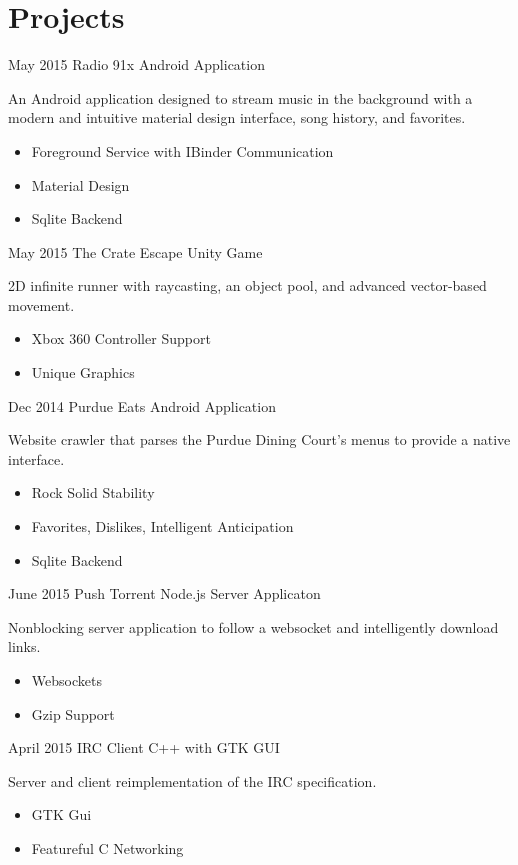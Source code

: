 \documentclass[]{friggeri-cv} %
\begin{document}
\section{Projects}

\begin{entrylist}


\entry
{May 2015}
{Radio 91x}
{Android Application}
{An Android application designed to stream music in the background with a modern and intuitive material design interface, song history, and favorites.
\begin{itemize}
\item Foreground Service with IBinder Communication
\item Material Design
\item Sqlite Backend
\end{itemize}}


\entry
{May 2015}
{The Crate Escape}
{Unity Game}
{2D infinite runner with raycasting, an object pool, and advanced vector-based movement.
\begin{itemize}
\item Xbox 360 Controller Support
\item Unique Graphics
\end{itemize}}


\entry
{Dec 2014}
{Purdue Eats}
{Android Application}
{Website crawler that parses the Purdue Dining Court's menus to provide a native interface.
\begin{itemize}
\item Rock Solid Stability
\item Favorites, Dislikes, Intelligent Anticipation
\item Sqlite Backend
\end{itemize}}


\entry
{June 2015}
{Push Torrent}
{Node.js Server Applicaton}
{Nonblocking server application to follow a websocket and intelligently download links.
\begin{itemize}
\item Websockets
\item Gzip Support
\end{itemize}}


\entry
{April 2015}
{IRC Client}
{C++ with GTK GUI}
{Server and client reimplementation of the IRC specification.
\begin{itemize}
\item GTK Gui
\item Featureful C Networking
\end{itemize}}

\end{entrylist}
\end{document}
